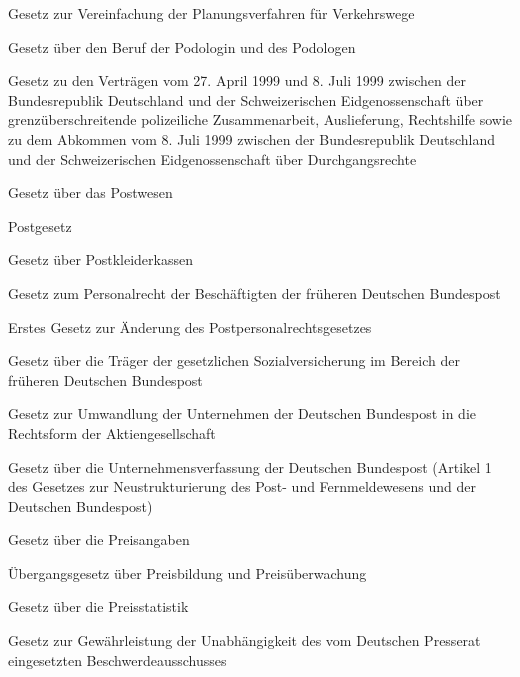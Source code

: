 \item[{PlVereinfG}] Gesetz zur Vereinfachung der Planungsverfahren für Verkehrswege

\item[{PodG}] Gesetz über den Beruf der Podologin und des Podologen

\item[{PolZusuaVtrCHEG}] Gesetz zu den Verträgen vom 27. April 1999 und 8. Juli 1999 zwischen der Bundesrepublik Deutschland und der Schweizerischen Eidgenossenschaft über grenzüberschreitende polizeiliche Zusammenarbeit, Auslieferung, Rechtshilfe sowie zu dem Abkommen vom 8. Juli 1999 zwischen der Bundesrepublik Deutschland und der Schweizerischen Eidgenossenschaft über Durchgangsrechte

\item[{PostG}] Gesetz über das Postwesen

\item[{PostG-1998}] Postgesetz

\item[{PostKlKG}] Gesetz über Postkleiderkassen

\item[{PostPersRG}] Gesetz zum Personalrecht der Beschäftigten der früheren Deutschen Bundespost

\item[{PostPersRGÄndG-1}] Erstes Gesetz zur Änderung des Postpersonalrechtsgesetzes

\item[{PostSVOrgG}] Gesetz über die Träger der gesetzlichen Sozialversicherung im Bereich der früheren Deutschen Bundespost

\item[{PostUmwG}] Gesetz zur Umwandlung der Unternehmen der Deutschen Bundespost in die Rechtsform der Aktiengesellschaft

\item[{PostVerfG}] Gesetz über die Unternehmensverfassung der Deutschen Bundespost (Artikel 1 des Gesetzes zur Neustrukturierung des Post- und Fernmeldewesens und der Deutschen Bundespost)

\item[{PreisAngG}] Gesetz über die Preisangaben

\item[{PreisG}] Übergangsgesetz über Preisbildung und Preisüberwachung

\item[{PreisStatG}] Gesetz über die Preisstatistik

\item[{PresseratG}] Gesetz zur Gewährleistung der Unabhängigkeit des vom Deutschen Presserat eingesetzten Beschwerdeausschusses

